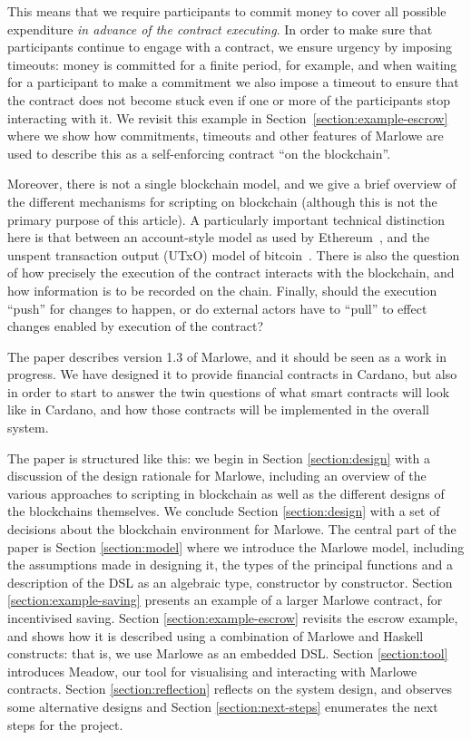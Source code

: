 \documentclass[runningheads]{llncs}
\begin{document}
This means that we require participants to commit money to cover all possible expenditure \emph{in advance of the 
contract executing}. In order to make sure that participants continue to engage with a contract, we ensure urgency by 
imposing timeouts: money is committed for a finite period, for example, and when waiting for a participant to make a 
commitment we also impose a timeout to ensure that the contract does not become stuck even if one or more of the 
participants stop interacting with it. We revisit this example in Section~\ref{section:example-escrow} where we show how 
commitments, timeouts and other features of Marlowe are used to describe this as a self-enforcing contract ``on the 
blockchain''.

Moreover, there is not a single blockchain model, and we give a brief overview of the different mechanisms for 
scripting on blockchain (although this is not the primary purpose of this article). 
A particularly important technical distinction here is that between an account-style model as used by 
Ethereum~\cite{EthereumRationale}, and the unspent transaction output (UTxO) model of bitcoin~\cite{sok}. 
There is also the question of how precisely the execution of the contract interacts with the blockchain, and how 
information is to be recorded on the chain. Finally, should the execution ``push'' for changes  to happen, or do 
external actors have to ``pull'' to effect changes enabled by execution of the contract?

The paper describes version 1.3 of Marlowe, and it should be seen as a work in progress. We have designed it to provide 
financial contracts in Cardano, but also in order to start to answer the twin questions of what smart contracts will 
look like in Cardano, and how those contracts will be implemented in the overall system.

The paper is structured like this: we begin in Section \ref{section:design} with a discussion of the design rationale 
for Marlowe, including an overview of the various approaches to scripting in blockchain as well as the different designs 
of the blockchains themselves. We conclude Section \ref{section:design} with a set of decisions about the blockchain 
environment for Marlowe. The central part of the paper is Section \ref{section:model} where we introduce the Marlowe 
model, including the assumptions made in designing it, the types of the principal functions and a description of the DSL 
as an algebraic type, constructor by constructor. Section \ref{section:example-saving} presents an example of a larger 
Marlowe contract, for incentivised saving. Section \ref{section:example-escrow} revisits the escrow example, and shows 
how it is described using a combination of Marlowe and Haskell constructs: that is, we use Marlowe as an embedded DSL. 
Section \ref{section:tool} introduces Meadow, our tool for visualising and interacting with Marlowe contracts.
Section \ref{section:reflection} reflects on the system design, and observes some alternative designs and Section 
\ref{section:next-steps} enumerates the next steps for the project.
\end{document}
